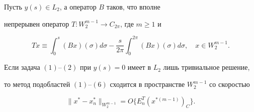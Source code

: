 \begin{thm}


Пусть $y(s) \in L_2$, а оператор $B$ таков, что вполне


непрерывен оператор $T:W_2^{m-1} \to C_{2 \pi}$, где $m \geq 1$ и


$$


Tx \equiv \int_{0}^{s} (Bx)( \sigma) d \sigma -


\frac{s}{2 \pi} \int_{0}^{2 \pi}(Bx)


( \sigma) d \sigma, \quad x \in W_2^{m-1}.


$$


Если задача $(1)$--$(2)$ при $y(s)=0$ имеет в $L_2$ лишь тривиальное решение,


то метод подобластей $(1)$--$(6)$ сходится в пространстве $ W_2^{m-1} $ со скоростью


\begin{equation}


\| x^* - x_n^* \|_{W_2^{m-1}}=O \lbrace E_n^T(x^{*(m-1)})_{C} \rbrace.


\end{equation}


\end{thm}








